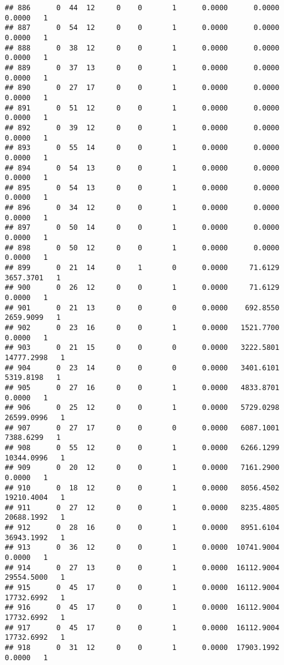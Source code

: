 \documentclass[
]{article}
\begin{document}
\begin{enumerate}
\begin{verbatim}
## 886      0  44  12     0    0       1      0.0000      0.0000      0.0000   1
## 887      0  54  12     0    0       1      0.0000      0.0000      0.0000   1
## 888      0  38  12     0    0       1      0.0000      0.0000      0.0000   1
## 889      0  37  13     0    0       1      0.0000      0.0000      0.0000   1
## 890      0  27  17     0    0       1      0.0000      0.0000      0.0000   1
## 891      0  51  12     0    0       1      0.0000      0.0000      0.0000   1
## 892      0  39  12     0    0       1      0.0000      0.0000      0.0000   1
## 893      0  55  14     0    0       1      0.0000      0.0000      0.0000   1
## 894      0  54  13     0    0       1      0.0000      0.0000      0.0000   1
## 895      0  54  13     0    0       1      0.0000      0.0000      0.0000   1
## 896      0  34  12     0    0       1      0.0000      0.0000      0.0000   1
## 897      0  50  14     0    0       1      0.0000      0.0000      0.0000   1
## 898      0  50  12     0    0       1      0.0000      0.0000      0.0000   1
## 899      0  21  14     0    1       0      0.0000     71.6129   3657.3701   1
## 900      0  26  12     0    0       1      0.0000     71.6129      0.0000   1
## 901      0  21  13     0    0       0      0.0000    692.8550   2659.9099   1
## 902      0  23  16     0    0       1      0.0000   1521.7700      0.0000   1
## 903      0  21  15     0    0       0      0.0000   3222.5801  14777.2998   1
## 904      0  23  14     0    0       0      0.0000   3401.6101   5319.8198   1
## 905      0  27  16     0    0       1      0.0000   4833.8701      0.0000   1
## 906      0  25  12     0    0       1      0.0000   5729.0298  26599.0996   1
## 907      0  27  17     0    0       0      0.0000   6087.1001   7388.6299   1
## 908      0  55  12     0    0       1      0.0000   6266.1299  10344.0996   1
## 909      0  20  12     0    0       1      0.0000   7161.2900      0.0000   1
## 910      0  18  12     0    0       1      0.0000   8056.4502  19210.4004   1
## 911      0  27  12     0    0       1      0.0000   8235.4805  20688.1992   1
## 912      0  28  16     0    0       1      0.0000   8951.6104  36943.1992   1
## 913      0  36  12     0    0       1      0.0000  10741.9004      0.0000   1
## 914      0  27  13     0    0       1      0.0000  16112.9004  29554.5000   1
## 915      0  45  17     0    0       1      0.0000  16112.9004  17732.6992   1
## 916      0  45  17     0    0       1      0.0000  16112.9004  17732.6992   1
## 917      0  45  17     0    0       1      0.0000  16112.9004  17732.6992   1
## 918      0  31  12     0    0       1      0.0000  17903.1992      0.0000   1

\end{verbatim}
\end{enumerate}
\end{document}
